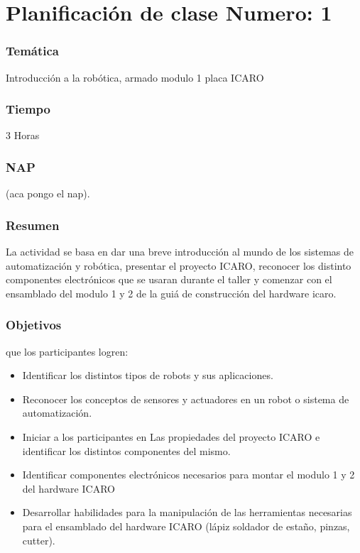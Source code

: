 \section*{Planificación de clase Numero: 1}
\subsubsection{Temática}
Introducción a la robótica, armado modulo 1 placa ICARO
\subsubsection{Tiempo}
3 Horas
\subsubsection{NAP}

(aca pongo el nap).

\subsubsection{Resumen}

La actividad se basa en dar una breve introducción al mundo de los sistemas de automatización y robótica, presentar el proyecto ICARO, reconocer los distinto componentes electrónicos que se usaran durante el taller y comenzar con el ensamblado del modulo 1 y 2 de la guiá de construcción del hardware icaro.

\subsubsection{Objetivos}
que los participantes logren:
\begin{itemize}
  \item Identificar los distintos tipos de robots y sus aplicaciones.
  \item Reconocer los conceptos de sensores y actuadores en un robot o sistema de automatización.
  \item Iniciar a los participantes en Las propiedades del proyecto ICARO e identificar los distintos componentes del mismo.
  \item Identificar componentes electrónicos necesarios para montar el modulo 1 y 2 del hardware ICARO
  \item Desarrollar habilidades para la manipulación de las herramientas necesarias para el ensamblado del hardware ICARO (lápiz soldador de estaño, pinzas, cutter).
  \end{itemize}

